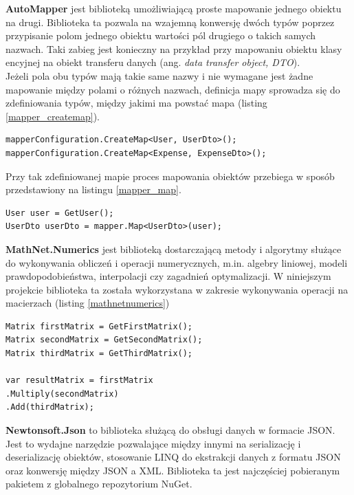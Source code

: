 \textbf{AutoMapper} jest biblioteką umożliwiającą proste mapowanie jednego obiektu na drugi.\cite{automapper} Biblioteka ta pozwala na wzajemną konwersję dwóch typów poprzez przypisanie polom jednego obiektu wartości pól drugiego o takich samych nazwach. Taki zabieg jest konieczny na przykład przy mapowaniu obiektu klasy encyjnej na obiekt transferu danych (ang. \textit{data transfer object, DTO}).\\
Jeżeli pola obu typów mają takie same nazwy i nie wymagane jest żadne mapowanie między polami o różnych nazwach, definicja mapy sprowadza się do zdefiniowania typów, między jakimi ma powstać mapa (listing \ref{mapper_createmap}).
\begin{lstlisting}[label={mapper_createmap}, caption={Definiowanie mapowania między dwoma typami.}, captionpos=b]
mapperConfiguration.CreateMap<User, UserDto>();
mapperConfiguration.CreateMap<Expense, ExpenseDto>();
\end{lstlisting}
Przy tak zdefiniowanej mapie proces mapowania obiektów przebiega w sposób przedstawiony na listingu \ref{mapper_map}.
\begin{lstlisting}[label={mapper_map}, caption={Mapowanie jednego obiektu na drugi.}, captionpos=b]
User user = GetUser();
UserDto userDto = mapper.Map<UserDto>(user);
\end{lstlisting}

\textbf{MathNet.Numerics} jest biblioteką dostarczającą metody i algorytmy służące do wykonywania obliczeń i operacji numerycznych, m.in. algebry liniowej, modeli prawdopodobieństwa, interpolacji czy zagadnień optymalizacji.\cite{mathnetnumerics} W niniejszym projekcie biblioteka ta została wykorzystana w zakresie wykonywania operacji na macierzach (listing \ref{mathnetnumerics})
\begin{lstlisting}[label={mathnetnumerics}, caption={Operacje na macierzach przy użyciu biblioteki MathNet.Numerics.}, captionpos=b]
Matrix firstMatrix = GetFirstMatrix();
Matrix secondMatrix = GetSecondMatrix();
Matrix thirdMatrix = GetThirdMatrix();

var resultMatrix = firstMatrix
.Multiply(secondMatrix)
.Add(thirdMatrix);
\end{lstlisting}

\textbf{Newtonsoft.Json} to biblioteka służącą do obsługi danych w formacie JSON. Jest to wydajne narzędzie pozwalające między innymi na serializację i deserializację obiektów, stosowanie LINQ do ekstrakcji danych z formatu JSON oraz konwersję między JSON a XML.\cite{newtonsoft} Biblioteka ta jest najczęściej pobieranym pakietem z globalnego repozytorium NuGet.\cite{nugetstats}
